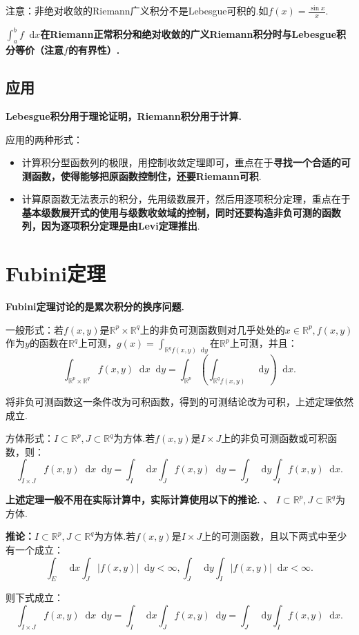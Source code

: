 \documentclass[bwprint, withoutpreface]{cumcmthesis}
\newcommand*{\dif}{\mathop{}\!\mathrm{d}}
\begin{document}
注意：非绝对收敛的Riemann广义积分不是Lebesgue可积的.如$f(x) = \frac{\sin{x}}{x}$.

$\int_{a}^{b} f \dif x$\textbf{在Riemann正常积分和绝对收敛的广义Riemann积分时与Lebesgue积分等价（注意$f$的有界性）.}

\subsection{应用}
\textbf{Lebesgue积分用于理论证明，Riemann积分用于计算.}

应用的两种形式：
\begin{itemize}[itemindent=2em]
	\item 计算积分型函数列的极限，用控制收敛定理即可，重点在于\textbf{寻找一个合适的可测函数，使得能够把原函数控制住，还要Riemann可积}.
	\item 计算原函数无法表示的积分，先用级数展开，然后用逐项积分定理，重点在于\textbf{基本级数展开式的使用与级数收敛域的控制，同时还要构造非负可测的函数列，因为逐项积分定理是由Levi定理推出}.
\end{itemize}

\section{Fubini定理}

\textbf{Fubini定理讨论的是累次积分的换序问题.}

一般形式：若$f(x, y)$是$\mathbb{R}^p \times \mathbb{R}^q$上的非负可测函数则对几乎处处的$x \in \mathbb{R}^p, f(x, y)$作为$y$的函数在$\mathbb{R}^q$上可测，$g(x) = \int_{\mathbb{R}^q f(x, y) \dif y}$在$\mathbb{R}^p$上可测，并且：
\begin{equation*}
	\int_{\mathbb{R}^p \times \mathbb{R}^q} f(x, y) \dif x \dif y = \int_{\mathbb{R}^p}(\int_{\mathbb{R}^q f(x, y)} \dif y) \dif x.
\end{equation*}

将非负可测函数这一条件改为可积函数，得到的可测结论改为可积，上述定理依然成立.

方体形式：$I \subset \mathbb{R}^p, J \subset \mathbb{R}^q$为方体.若$f(x, y)$是$I \times J$上的非负可测函数或可积函数，则：
\begin{equation*}
	\int_{I \times J} f(x, y) \dif x \dif y = \int_I \dif x \int_J f(x, y) \dif y = \int_J \dif y \int_I f(x, y) \dif x. 
\end{equation*}

\textbf{上述定理一般不用在实际计算中，实际计算使用以下的推论.}
、
$I \subset \mathbb{R}^p, J \subset \mathbb{R}^q$为方体.

\textbf{推论：}$I \subset \mathbb{R}^p, J \subset \mathbb{R}^q$为方体.若$f(x, y)$是$I \times J$上的可测函数，且以下两式中至少有一个成立：
\begin{equation*}
	\int_E \dif x \int_J |f(x, y)| \dif y < \infty, \int_J \dif y \int_I |f(x, y)| \dif x < \infty.
\end{equation*}

则下式成立：
\begin{equation*}
	\int_{I \times J} f(x, y) \dif x \dif y = \int_I \dif x \int_J f(x, y) \dif y = \int_J \dif y \int_I f(x, y) \dif x. 
\end{equation*}
\end{document}

